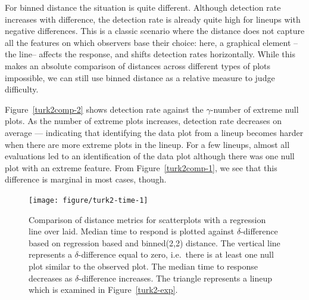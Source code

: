 \documentclass[12pt]{article}\usepackage[]{graphicx}\usepackage[]{color}
\newenvironment{knitrout}{}{} %
\begin{document}
For binned distance the situation is quite different.  Although detection rate increases with difference, the detection rate is already quite high for lineups with negative differences. This is a classic scenario where the distance does not capture all the features on which observers base their choice: here, a graphical element --the line-- affects the response, and shifts detection rates horizontally. %
While this makes an absolute comparison of distances across different types of plots impossible, we can still use binned distance as a relative measure to judge difficulty.


Figure~\ref{turk2comp-2} shows  detection rate against the $\gamma$-number of extreme null plots. As the number of extreme plots increases,  detection rate decreases on average --- indicating that identifying the data plot from a lineup becomes harder when there are more extreme plots in the lineup. For a few lineups, almost all evaluations led to an identification of the data plot although there was one null plot with an extreme feature. From Figure~\ref{turk2comp-1}, we see that this difference is marginal in most cases, though. 

\begin{figure}[!t]
\centering
\begin{knitrout}
\color{fgcolor}
\texttt{[image: figure/turk2-time-1]} 

\end{knitrout}
	\vspace{-.1in}
\caption{Comparison of distance metrics for scatterplots with a regression line over laid. Median time to respond is plotted against $\delta$-difference based on  regression based and binned(2,2) distance. The vertical line represents a $\delta$-difference equal to zero, i.e.\ there is at least one null plot similar to the observed plot. The median time to response decreases as $\delta$-difference increases. The triangle represents a lineup which is examined in Figure~\ref{turk2-exp}.   }
\label{turk2-mtime}
\end{figure}
\end{document}
